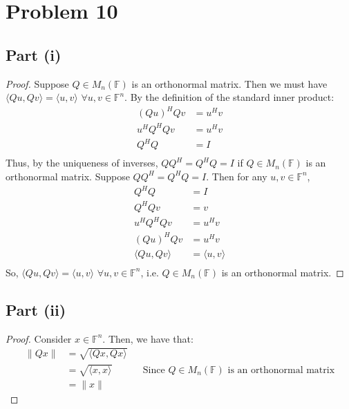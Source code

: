 \documentclass{article}
\begin{document}
\section*{Problem 10}

\subsection*{Part (i)}

\begin{proof}
Suppose $Q \in M_n(\mathbb{F})$ is an orthonormal matrix. Then we must have $\langle Qu, Qv \rangle = \langle u, v \rangle$ $\forall u, v \in \mathbb{F}^n$. By the definition of the standard inner product:
\begin{align*}
(Qu)^{H}Qv &= u^{H}v \\
u^{H}Q^{H}Qv &= u^{H}v \\
Q^{H}Q &= I \\
\end{align*}
Thus, by the uniqueness of inverses, $QQ^{H} = Q^{H}Q = I$ if $Q \in M_{n}(\mathbb{F})$ is an orthonormal matrix.
Suppose $QQ^{H} = Q^{H}Q = I$. Then for any $u, v \in \mathbb{F}^n$,
\begin{align*}
Q^{H}Q &= I \\
Q^{H}Qv &= v \\
u^{H}Q^{H}Qv &= u^{H}v \\
(Qu)^{H}Qv &= u^{H}v \\
\langle Qu, Qv \rangle &= \langle u, v \rangle \\
\end{align*}
So, $\langle Qu, Qv \rangle = \langle u, v \rangle$ $\forall u, v \in \mathbb{F}^n$, i.e. $Q \in M_n(\mathbb{F})$ is an orthonormal matrix.
\end{proof}

\subsection*{Part (ii)}

\begin{proof}
Consider $x \in \mathbb{F}^n$. Then, we have that:
\begin{align*}
\|Qx\| &= \sqrt{\langle Qx, Qx \rangle} \\
&= \sqrt{\langle x, x \rangle} &&\text{Since $Q \in M_n(\mathbb{F})$ is an orthonormal matrix} \\
&= \|x\|
\end{align*}
\end{proof}
\end{document}

